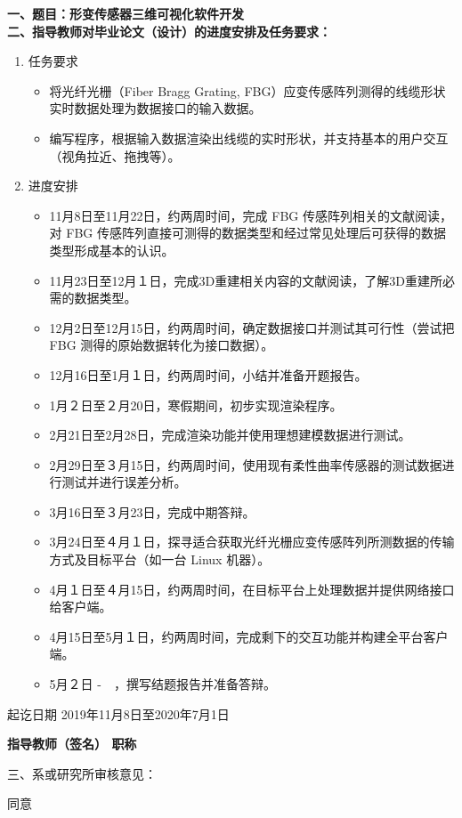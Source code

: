 \clearpage
{}

{
    \bfseries
    \noindent 一、题目：形变传感器三维可视化软件开发\\
    \noindent 二、指导教师对毕业论文（设计）的进度安排及任务要求：\\

    \begin{enumerate}
        \item 任务要求
        \begin{itemize}
            \item 将光纤光栅（Fiber Bragg Grating, FBG）应变传感阵列测得的线缆形状实时数据处理为数据接口的输入数据。
            \item 编写程序，根据输入数据渲染出线缆的实时形状，并支持基本的用户交互（视角拉近、拖拽等）。
        \end{itemize}
        \item 进度安排
        \begin{itemize}
            \item 11月8日至11月22日，约两周时间，完成 FBG 传感阵列相关的文献阅读，对 FBG 传感阵列直接可测得的数据类型和经过常见处理后可获得的数据类型形成基本的认识。
            \item 11月23日至12月１日，完成3D重建相关内容的文献阅读，了解3D重建所必需的数据类型。
            \item 12月2日至12月15日，约两周时间，确定数据接口并测试其可行性（尝试把 FBG 测得的原始数据转化为接口数据）。
            \item 12月16日至1月１日，约两周时间，小结并准备开题报告。
            \item 1月２日至２月20日，寒假期间，初步实现渲染程序。
            \item 2月21日至2月28日，完成渲染功能并使用理想建模数据进行测试。
            \item 2月29日至３月15日，约两周时间，使用现有柔性曲率传感器的测试数据进行测试并进行误差分析。
            \item 3月16日至３月23日，完成中期答辩。
            \item 3月24日至４月１日，探寻适合获取光纤光栅应变传感阵列所测数据的传输方式及目标平台（如一台 Linux 机器）。
            \item 4月１日至４月15日，约两周时间，在目标平台上处理数据并提供网络接口给客户端。
            \item 4月15日至5月１日，约两周时间，完成剩下的交互功能并构建全平台客户端。
            \item 5月２日 -　，撰写结题报告并准备答辩。

        \end{itemize}
    \end{enumerate}

    起讫日期 2019年11月8日至2020年7月1日
    \begin{flushright}
        \bfseries {}
            指导教师（签名） \underline{} 职称 \underline{}
    \end{flushright}

    \noindent 三、系或研究所审核意见：
    
    同意

    \mbox{} \vfill
    \signature{负责人（签名）}
}
